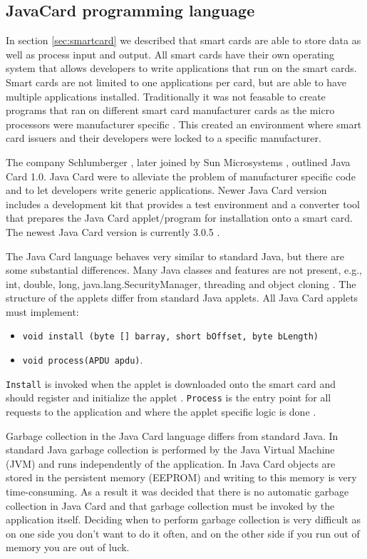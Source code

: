 \subsection{JavaCard programming language}
\label{sec:javacard}
In section \ref{sec:smartcard} we described that smart cards are able to store data as well as process input and output. All smart cards have their own operating system that allows developers to write applications that run on the smart cards. Smart cards are not limited to one applications per card, but are able to have multiple applications installed. Traditionally it was not feasable to create programs that ran on different smart card manufacturer cards as the micro processors were manufacturer specific \cite{javacardapplet}. This created an environment where smart card issuers and their developers were locked to a specific manufacturer.

The company Schlumberger \cite{schlumberger}, later joined by Sun Microsystems \cite{sunMicroSystems}, outlined Java Card 1.0. Java Card were to alleviate the problem of manufacturer specific code and to let developers write generic applications. Newer Java Card version includes a development kit that provides a test environment and a converter tool that prepares the Java Card applet/program for installation onto a smart card. The newest Java Card version is currently 3.0.5 \cite{javacard305}.

The Java Card language behaves very similar to standard Java, but there are some substantial differences. Many Java classes and features are not present, e.g., int, double, long, java.lang.SecurityManager, threading and object cloning \cite{javacardlimits}. The structure of the applets differ from standard Java applets. All Java Card applets must implement:
\begin{itemize}
    \item \texttt{void install (byte [] barray, short bOffset, byte bLength)}
    \item \texttt{void process(APDU apdu)}.
\end{itemize}
\texttt{Install} is invoked when the applet is downloaded onto the smart card and should register and initialize the applet \cite{javacardinstall}. \texttt{Process} is the entry point for all requests to the application and where the applet specific logic is done \cite{javacardprocess}.

Garbage collection in the Java Card language differs from standard Java. In standard Java garbage collection is performed by the Java Virtual Machine (JVM) and runs independently of the application. In Java Card objects are stored in the persistent memory (EEPROM) and writing to this memory is very time-consuming. As a result it was decided that there is no automatic garbage collection in Java Card and that garbage collection must be invoked by the application itself. Deciding when to perform garbage collection is very difficult as on one side you don't want to do it often, and on the other side if you run out of memory you are out of luck.

